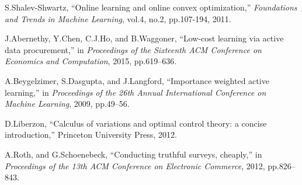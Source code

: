 \documentclass[10pt,conference,compsocconf,letterpaper]{IEEEtran}
\begin{document}
\begin{thebibliography}{99}
S.Shalev-Shwartz, ``Online learning and online convex optimization,'' \emph{Foundations and Trends in Machine Learning}, vol.4, no.2, pp.107-194, 2011.

J.Abernethy, Y.Chen, C.J.Ho, and B.Waggoner, ``Low-cost learning via active data procurement,'' in \emph{Proceedings of the Sixteenth ACM Conference on Economics and Computation}, 2015, pp.619--636.

A.Beygelzimer, S.Dasgupta, and J.Langford, ``Importance weighted active learning,'' in \emph{Proceedings of the 26th Annual International Conference on Machine Learning}, 2009, pp.49--56.

D.Liberzon, ``Calculus of variations and optimal control theory: a concise introduction,'' Princeton University Press, 2012.

A.Roth, and G.Schoenebeck, ``Conducting truthful surveys, cheaply,'' in \emph{Proceedings of the 13th ACM Conference on Electronic Commerce}, 2012, pp.826--843.



\end{thebibliography}
\end{document}
